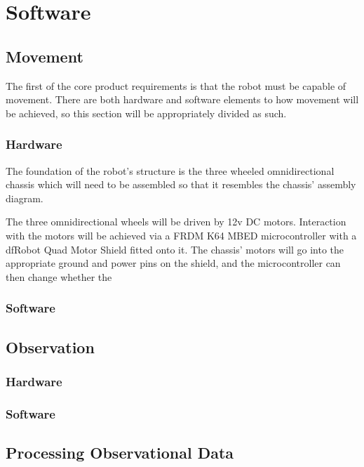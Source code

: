 	\section{Software}
	
		\subsection{Movement}
		The first of the core product requirements is that the robot must be capable of movement. There are both hardware and software elements to how movement will be achieved, so this section will be appropriately divided as such.
		
			\subsubsection{Hardware}	
			The foundation of the robot's structure is the three wheeled omnidirectional chassis which will need to be assembled so that it resembles the chassis' assembly diagram.
			
			 The three omnidirectional wheels will be driven by 12v DC motors. Interaction with the motors will be achieved via a FRDM K64 MBED microcontroller with a dfRobot Quad Motor Shield fitted onto it. The chassis' motors will go into the appropriate ground and power pins on the shield, and the microcontroller can then change whether the 
			
			\subsubsection{Software}
		
		
		\subsection{Observation}
			\subsubsection{Hardware}
			\subsubsection{Software}
		
		\subsection{Processing Observational Data}
		
